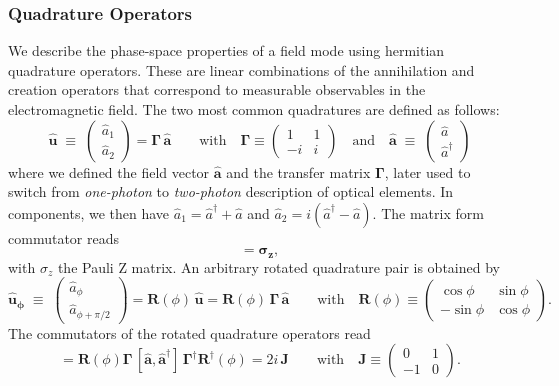\subsubsection{Quadrature Operators}
We describe the phase-space properties of a field mode using hermitian quadrature operators. These are linear combinations of the annihilation and creation operators that correspond to measurable observables in the electromagnetic field. The two most common quadratures are defined as follows:
\begin{equation}
\mathbf{\hat{u}}\;\equiv\;
\begin{pmatrix}\hat a_1\\[2pt]\hat a_2\end{pmatrix}
=\mathbf\Gamma \, \mathbf{\hat{a}}  \label{II.2}
\qquad \text{with} \quad
\mathbf \Gamma \equiv
\begin{pmatrix}
1 & 1 \\
-i & i
\end{pmatrix}
\quad
\text{and} \quad
\mathbf{\hat{a}}\;\equiv\;
\begin{pmatrix}\hat a\\ \hat a^\dagger\end{pmatrix}
\end{equation}
where we defined the field vector $\mathbf{\hat{a}}$ and the transfer matrix $\mathbf \Gamma$, later used to switch from \textit{one-photon} to \textit{two-photon} description of optical elements. In components, we then have $\hat a_1=\hat a^\dagger+\hat a$ and $\hat a_2=i(\hat a^\dagger-\hat a)$.
The matrix form commutator reads
\begin{equation}
[\mathbf{\hat{a}}, \mathbf{\hat{a}}^{\dagger}] = \mathbf{\sigma_z}, 
\end{equation}
with $\sigma_z$ the Pauli Z matrix. 
An arbitrary rotated quadrature pair is obtained by
\begin{equation}
\mathbf{\hat{u}_\phi}\;\equiv\;
\begin{pmatrix}\hat a_\phi\\[2pt]\hat a_{\phi+\pi/2}\end{pmatrix}
= \mathbf R(\phi)\,\mathbf{\hat{u}}
= \mathbf R(\phi)\,\mathbf\Gamma \,\mathbf{\hat{a}}
\qquad
\text{with} \quad
 \mathbf R(\phi)\equiv
\begin{pmatrix}
\cos\phi & \sin\phi \\
-\sin\phi & \cos\phi \label{II.4}
\end{pmatrix}.
\end{equation}
The commutators of the rotated quadrature operators read
\begin{equation}
[\mathbf{\hat{u}}_\phi , \mathbf{\hat{u}}_\phi^{\dagger}]
= \mathbf R(\phi) \mathbf \Gamma\,[\hat{\mathbf{a}},\hat{\mathbf{a}}^{\dagger}]\, \mathbf \Gamma^{\dagger} \mathbf R^{\dagger}(\phi) = 2i\,\mathbf J \qquad \text{with} \quad
\mathbf{J} \equiv
\begin{pmatrix}
0 & 1 \\
-1 & 0
\end{pmatrix}.
\end{equation}

